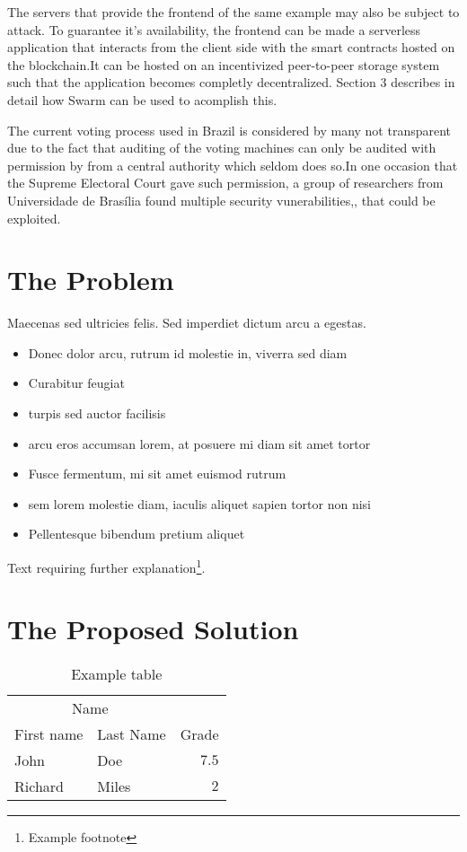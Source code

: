 \documentclass[twoside,twocolumn]{article}
\begin{document}
The servers that provide the frontend of the same example may also be subject to attack. To guarantee it's availability, the frontend can be made a serverless application that interacts from the client side with the smart contracts hosted on the blockchain.It can be hosted on an incentivized peer-to-peer storage system such that the application becomes completly decentralized. Section 3 describes in detail how Swarm can be used to acomplish this.

The current voting process used in Brazil is considered by many not transparent\cite{1} due to the fact that auditing of the voting machines can only be audited with permission by from a central authority \cite{2} which seldom does so\cite{3}.In one occasion that the Supreme Electoral Court gave such permission, a group of researchers from Universidade de Bras\'ilia found multiple security vunerabilities\cite{4},\cite{5},\cite{6} that could be exploited.

\section{The Problem}

Maecenas sed ultricies felis. Sed imperdiet dictum arcu a egestas. 
\begin{itemize}
\item Donec dolor arcu, rutrum id molestie in, viverra sed diam
\item Curabitur feugiat
\item turpis sed auctor facilisis
\item arcu eros accumsan lorem, at posuere mi diam sit amet tortor
\item Fusce fermentum, mi sit amet euismod rutrum
\item sem lorem molestie diam, iaculis aliquet sapien tortor non nisi
\item Pellentesque bibendum pretium aliquet
\end{itemize}
\blindtext %

Text requiring further explanation\footnote{Example footnote}.


\section{The Proposed Solution}

\begin{table}
\caption{Example table}
\centering
\begin{tabular}{llr}
\toprule
\multicolumn{2}{c}{Name} \\
\cmidrule(r){1-2}
First name & Last Name & Grade \\
\midrule
John & Doe & $7.5$ \\
Richard & Miles & $2$ \\
\bottomrule
\end{tabular}
\end{table}
\end{document}
